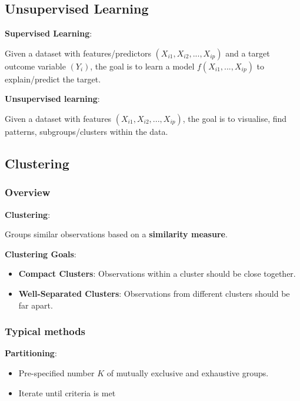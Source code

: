 \subsection{Unsupervised Learning}

\indent 

\noindent \textbf{Supervised Learning}:

Given a dataset with features/predictors $(X_{i1},X_{i2},...,X_{ip})$ and a target outcome variable $(Y_i)$, the goal is to learn a model $f(X_{i1},...,X_{ip})$ to explain/predict the target.

\noindent \textbf{Unsupervised learning}:

Given a dataset with features $(X_{i1},X_{i2},...,X_{ip})$, the goal is to visualise, find patterns, subgroups/clusters within the data.

\subsection{Clustering}

\subsubsection{Overview}

\indent 

\noindent\textbf{Clustering}:

Groups similar observations based on a \textbf{similarity measure}.

\noindent\textbf{Clustering Goals}:

\begin{itemize}
    \item \textbf{Compact Clusters}: Observations within a cluster should be close together.
    \item \textbf{Well-Separated Clusters}: Observations from different clusters should be far apart.
\end{itemize}

\subsubsection{Typical methods}

\noindent\textbf{Partitioning}:

\begin{itemize}
    \item Pre-specified number $K$ of mutually exclusive and exhaustive groups.
    \item Iterate until criteria is met
\end{itemize}

